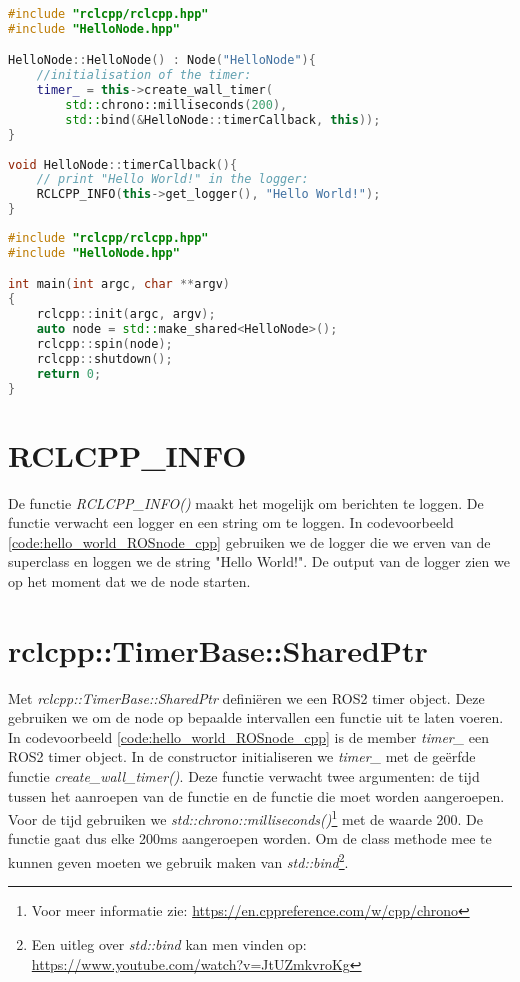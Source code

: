\begin{lstlisting}[language=C++, caption={HelloNode.cpp}, firstnumber=0, label={code:hello_world_ROSnode_cpp}]
#include "rclcpp/rclcpp.hpp"
#include "HelloNode.hpp"

HelloNode::HelloNode() : Node("HelloNode"){
    //initialisation of the timer:
    timer_ = this->create_wall_timer(
        std::chrono::milliseconds(200),
        std::bind(&HelloNode::timerCallback, this));
}
    
void HelloNode::timerCallback(){
    // print "Hello World!" in the logger:
    RCLCPP_INFO(this->get_logger(), "Hello World!");
}
\end{lstlisting}

\begin{lstlisting}[language=C++, caption={main.cpp}, firstnumber=0, label={code:hello_world_ROSnode_main}]
#include "rclcpp/rclcpp.hpp"
#include "HelloNode.hpp"

int main(int argc, char **argv)
{
    rclcpp::init(argc, argv);
    auto node = std::make_shared<HelloNode>();
    rclcpp::spin(node);
    rclcpp::shutdown();
    return 0;
}
\end{lstlisting}

\section{RCLCPP\_INFO}
De functie \textit{RCLCPP\_INFO()} maakt het mogelijk om berichten te loggen. De functie verwacht een logger en een string om te loggen. In codevoorbeeld \ref{code:hello_world_ROSnode_cpp} gebruiken we de logger die we erven van de superclass en loggen we de string "Hello World!".
De output van de logger zien we op het moment dat we de node starten.

\section{rclcpp::TimerBase::SharedPtr}
Met \textit{rclcpp::TimerBase::SharedPtr} definiëren we een ROS2 timer object. Deze gebruiken we om de node op bepaalde intervallen een functie uit te laten voeren. In codevoorbeeld \ref{code:hello_world_ROSnode_cpp} is de member \textit{timer\_} een ROS2 timer object. In de constructor initialiseren we \textit{timer\_} met de ge\"erfde functie \textit{create\_wall\_timer()}. Deze functie verwacht twee argumenten: de tijd tussen het aanroepen van de functie en de functie die moet worden aangeroepen. Voor de tijd gebruiken we \textit{std::chrono::milliseconds()}\footnote{Voor meer informatie zie: \url{https://en.cppreference.com/w/cpp/chrono}} met de waarde 200. De functie gaat dus elke 200ms aangeroepen worden. Om de class methode mee te kunnen geven moeten we gebruik maken van \textit{std::bind}\footnote{Een uitleg over \textit{std::bind} kan men vinden op: \url{https://www.youtube.com/watch?v=JtUZmkvroKg}}.

